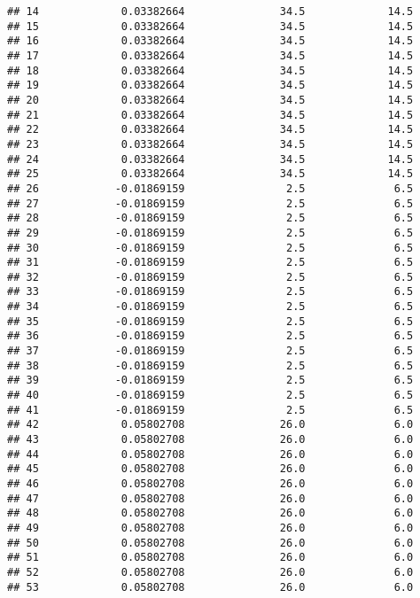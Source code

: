 \documentclass[]{article}
\begin{document}
\begin{verbatim}
## 14             0.03382664               34.5             14.5
## 15             0.03382664               34.5             14.5
## 16             0.03382664               34.5             14.5
## 17             0.03382664               34.5             14.5
## 18             0.03382664               34.5             14.5
## 19             0.03382664               34.5             14.5
## 20             0.03382664               34.5             14.5
## 21             0.03382664               34.5             14.5
## 22             0.03382664               34.5             14.5
## 23             0.03382664               34.5             14.5
## 24             0.03382664               34.5             14.5
## 25             0.03382664               34.5             14.5
## 26            -0.01869159                2.5              6.5
## 27            -0.01869159                2.5              6.5
## 28            -0.01869159                2.5              6.5
## 29            -0.01869159                2.5              6.5
## 30            -0.01869159                2.5              6.5
## 31            -0.01869159                2.5              6.5
## 32            -0.01869159                2.5              6.5
## 33            -0.01869159                2.5              6.5
## 34            -0.01869159                2.5              6.5
## 35            -0.01869159                2.5              6.5
## 36            -0.01869159                2.5              6.5
## 37            -0.01869159                2.5              6.5
## 38            -0.01869159                2.5              6.5
## 39            -0.01869159                2.5              6.5
## 40            -0.01869159                2.5              6.5
## 41            -0.01869159                2.5              6.5
## 42             0.05802708               26.0              6.0
## 43             0.05802708               26.0              6.0
## 44             0.05802708               26.0              6.0
## 45             0.05802708               26.0              6.0
## 46             0.05802708               26.0              6.0
## 47             0.05802708               26.0              6.0
## 48             0.05802708               26.0              6.0
## 49             0.05802708               26.0              6.0
## 50             0.05802708               26.0              6.0
## 51             0.05802708               26.0              6.0
## 52             0.05802708               26.0              6.0
## 53             0.05802708               26.0              6.0

\end{verbatim}
\end{document}
